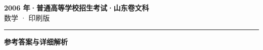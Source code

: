 \documentclass[zihao=5, a4paper]{ctexart}
\begin{document}
\begin{center}
  {\Large\bfseries 2006 年·普通高等学校招生考试·山东卷文科}\\[4pt]
  {\large 数学 · 印刷版}
\end{center}
\medskip
{}

\par\bigskip\hrule\bigskip
{}
\begin{center}{\large\bfseries 参考答案与详细解析}\end{center}
\smallskip

\end{document}
